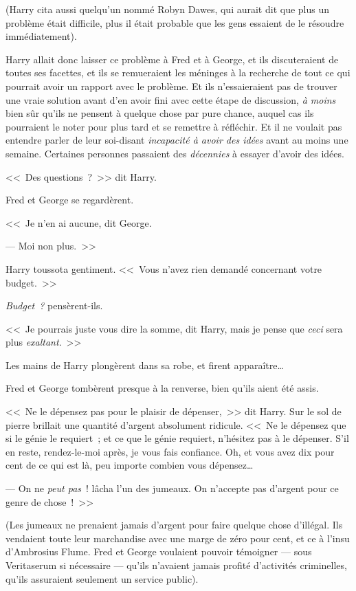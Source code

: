 (Harry cita aussi quelqu'un nommé Robyn Dawes, qui aurait dit que plus un problème était difficile, plus il était probable que les gens essaient de le résoudre immédiatement).

Harry allait donc laisser ce problème à Fred et à George, et ils discuteraient de toutes ses facettes, et ils se remueraient les méninges à la recherche de tout ce qui pourrait avoir un rapport avec le problème. Et ils n'essaieraient pas de trouver une vraie solution avant d'en avoir fini avec cette étape de discussion, \emph{à moins} bien sûr qu'ils ne pensent à quelque chose par pure chance, auquel cas ils pourraient le noter pour plus tard et se remettre à réfléchir. Et il ne voulait pas entendre parler de leur soi-disant \emph{incapacité à avoir des idées} avant au moins une semaine. Certaines personnes passaient des \emph{décennies} à essayer d'avoir des idées.

<<~Des questions~?~>> dit Harry.

Fred et George se regardèrent.

<<~Je n'en ai aucune, dit George.

--- Moi non plus.~>>

Harry toussota gentiment. <<~Vous n'avez rien demandé concernant votre budget.~>>

\emph{Budget~?} pensèrent-ils.

<<~Je pourrais juste vous dire la somme, dit Harry, mais je pense que \emph{ceci} sera plus \emph{exaltant}.~>>

Les mains de Harry plongèrent dans sa robe, et firent apparaître…

Fred et George tombèrent presque à la renverse, bien qu'ils aient été assis.

<<~Ne le dépensez pas pour le plaisir de dépenser,~>> dit Harry. Sur le sol de pierre brillait une quantité d'argent absolument ridicule. <<~Ne le dépensez que si le génie le requiert~; et ce que le génie requiert, n'hésitez pas à le dépenser. S'il en reste, rendez-le-moi après, je vous fais confiance. Oh, et vous avez dix pour cent de ce qui est là, peu importe combien vous dépensez…

--- On ne \emph{peut pas}~! lâcha l'un des jumeaux. On n'accepte pas d'argent pour ce genre de chose~!~>>

(Les jumeaux ne prenaient jamais d'argent pour faire quelque chose d'illégal. Ils vendaient toute leur marchandise avec une marge de zéro pour cent, et ce à l'insu d'Ambrosius Flume. Fred et George voulaient pouvoir témoigner — sous Veritaserum si nécessaire — qu'ils n'avaient jamais profité d'activités criminelles, qu'ils assuraient seulement un service public).

